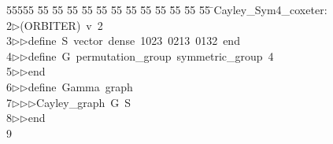 %
%
\begin{tabbing}
55555 \= 55 \= 55 \= 55 \= 55 \= 55 \= 55 \= 55 \= 55 \= 55 \= 55 \= 55 \= 55 \= \>Cayley\_Sym4\_coxeter:\\[0pt]
2\>$\triangleright$\>(ORBITER)\ v\ 2\ \\[0pt]
3\>$\triangleright$\>$\triangleright$\>define\ S\ vector\ dense\ 1023\ 0213\ 0132\ end\ \\[0pt]
4\>$\triangleright$\>$\triangleright$\>define\ G\ permutation\_group\ symmetric\_group\ 4\ \\[0pt]
5\>$\triangleright$\>$\triangleright$\>end\ \\[0pt]
6\>$\triangleright$\>$\triangleright$\>define\ Gamma\ graph\ \\[0pt]
7\>$\triangleright$\>$\triangleright$\>$\triangleright$\>Cayley\_graph\ G\ S\ \\[0pt]
8\>$\triangleright$\>$\triangleright$\>end\ \\[0pt]
9\>\end{tabbing}
